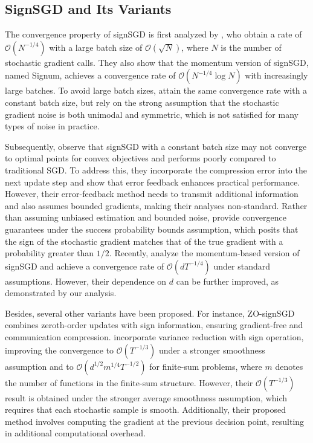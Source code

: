 \documentclass{article}
\begin{document}
\subsection{SignSGD and Its Variants}
The convergence property of signSGD is first analyzed by \cite{pmlr-v80-bernstein18a}, who obtain a rate of $\mathcal{O}(N^{-1/4})$ with a large batch size of $\mathcal{O}(\sqrt{N})$, where $N$ is the number of stochastic gradient calls. They also show that the momentum version of signSGD, named Signum, achieves a convergence rate of $\mathcal{O}(N^{-1/4} \log N)$ with increasingly large batches.
To avoid large batch sizes, \cite{bernstein2018signsgd} attain the same convergence rate with a constant batch size, but rely on the strong assumption that the stochastic gradient noise is both unimodal and symmetric, which is not satisfied for many types of noise in practice.

Subsequently, \cite{pmlr-v97-karimireddy19a} observe that signSGD with a constant batch size may not converge to optimal points for convex objectives and performs poorly compared to traditional SGD. To address this, they incorporate the compression error into the next update step and show that error feedback enhances practical performance. However, their error-feedback method needs to transmit additional information and also assumes bounded gradients, making their analyses non-standard. 
Rather than assuming unbiased estimation and bounded noise, \cite{pmlr-v139-safaryan21a} provide convergence guarantees under the success probability bounds assumption, which posits that the sign of the stochastic gradient matches that of the true gradient with a probability greater than $1/2$.
Recently, \cite{pmlr-v202-sun23l} analyze the momentum-based version of signSGD and achieve a convergence rate of $\mathcal{O}(dT^{-1/4})$ under standard assumptions. However, their dependence on $d$ can be further improved, as demonstrated by our analysis. 

Besides, several other variants have been proposed. For instance, ZO-signSGD~\citep{liu2018signsgd} combines zeroth-order updates with sign information, ensuring gradient-free and communication compression. \cite{NeurIPS:2024:Jiang:B} incorporate variance reduction with sign operation, improving the convergence to $\mathcal{O}(T^{-1/3})$ under a stronger smoothness assumption and to $\mathcal{O}(d^{1/2} m^{1/4} T^{-1/2})$ for finite-sum problems, where $m$ denotes the number of functions in the finite-sum structure. However, their $\mathcal{O}(T^{-1/3})$ result is obtained under the stronger average smoothness assumption, which requires that each stochastic sample is smooth. Additionally, their proposed method involves computing the gradient at the previous decision point, resulting in additional computational overhead.
\end{document}
